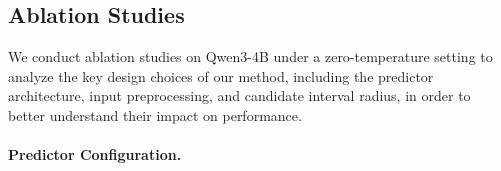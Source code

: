 \documentclass{llmxive}
\begin{document}







\subsection{Ablation Studies}
We conduct ablation studies on Qwen3-4B under a zero-temperature setting to analyze the key design choices of our method, including the predictor architecture, input preprocessing, and candidate interval radius, in order to better understand their impact on performance.




\paragraph{Predictor Configuration.}
\end{document}
